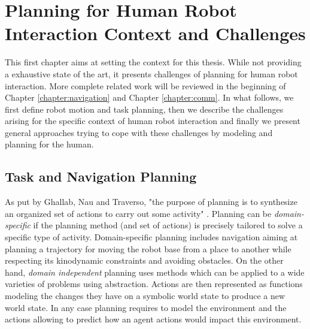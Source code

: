 \documentclass[a4paper,11pt,twoside]{StyleThese}
\begin{document}
\setcounter{chapter}{0} %
\dominitoc
\faketableofcontents
\fi

\chapter{Planning for Human Robot Interaction Context and Challenges}
\label{chapter:sota}
\minitoc


This first chapter aims at setting the context for this thesis. While not providing a exhaustive state of the art, it presents challenges of planning for human robot interaction. More complete related work will be reviewed in the beginning of Chapter \ref{chapter:navigation} and Chapter \ref{chapter:comm}. In what follows, we first define robot motion and task planning, then we describe the challenges arising for the specific context of human robot interaction and finally we present general approaches trying to cope with these challenges by modeling and planning for the human.

\section{Task and Navigation Planning}
As put by Ghallab, Nau and Traverso, "the purpose of planning is to synthesize an organized set of actions to carry out some activity" \cite{ghallab_nau_traverso_2016}. Planning can be \textit{domain-specific} if the planning method (and set of actions) is precisely tailored to solve a specific type of activity. Domain-specific planning includes navigation aiming at planning a trajectory for moving the robot base from a place to another while respecting its kinodynamic constraints and avoiding obstacles. On the other hand, \textit{domain independent} planning uses methods which can be applied to a wide varieties of problems using abstraction. Actions are then represented as functions modeling the changes they have on a symbolic world state to produce a new world state. In any case planning requires to model the environment and the actions allowing to predict how an agent actions would impact this environment.
\end{document}
